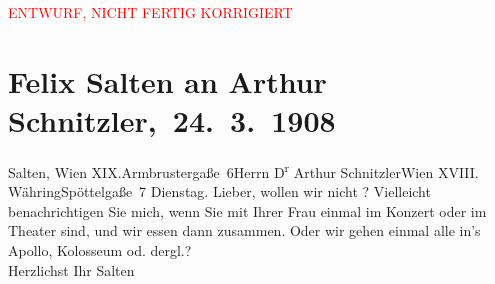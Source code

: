 
\begin{center}
            \textcolor{red}{ENTWURF, NICHT FERTIG KORRIGIERT}
                      \end{center}
            
         
         \renewcommand{\erwaehntePersonen}{Personen: Felix Salten, Olga Schnitzler}
         \renewcommand{\erwaehnteOrte}{Orte: Apollo-Theater, Armbrustergasse, Colosseum, Edmund-Weiß-Gasse 7, I., Innere Stadt, Ronacher, Wien, XIX., Döbling, XVIII., Währing}
         \renewcommand{\erwaehnteWerke}{}
               \section[ Felix Salten an Arthur Schnitzler, 24. 3. 1908]{ Felix Salten an Arthur Schnitzler, 24. 3. 1908}\nopagebreak{}\rehead{ }\begin{ledgroupsized}[t]{13cm}\normalsize\beginnumbering \toendnotes[C]{\smallbreak\pagebreak[2]} 
\toendnotes[C]{\smallbreak}\pstart{}{\pb}Salten, Wien XIX.\pend{}\pstart{}Armbrustergaße 6\pend{}{\bigskip}\pstart{}Herrn D\textsuperscript{r} Arthur Schnitzler\pend{}\pstart{}Wien XVIII. Währing\pend{}\pstart{}Spöttelgaße 7\pend{}{\bigskip}\pstart
           \raggedleft{}{\pb}Dienstag.\pend
           \pstart{}Lieber,\pend\pstart
           wollen wir nicht \label{K_L03493-1v}\label{K_L03493-1h}? Vielleicht benachrichtigen Sie mich, wenn Sie mit Ihrer Frau einmal im Konzert oder im
               Theater sind, und wir essen dann zusammen. Oder wir gehen einmal alle in’s Apollo, Kolosseum od. dergl.? {\\}Herzlichst\pend
           \pstart Ihr \spacefill\mbox{Salten}\pend{}
         
         \endnumbering{}\end{ledgroupsized}  \newcommand{\dateiname}{L03493}\newcommand{\titel}{Felix Salten an Arthur Schnitzler, 24. 3. 1908}\newcommand{\editorInnen}{Martin Anton Müller und Laura Untner}
      